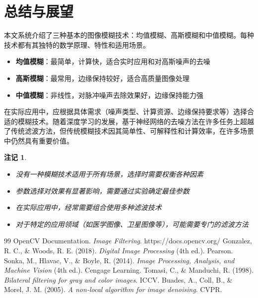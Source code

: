 \documentclass{article}
\newtheorem{remark}{注记}[section]
\begin{document}
\section{总结与展望}

本文系统介绍了三种基本的图像模糊技术：均值模糊、高斯模糊和中值模糊。每种技术都有其独特的数学原理、特性和适用场景。

\begin{itemize}
    \item \textbf{均值模糊}：最简单，计算快，适合实时应用和对高斯噪声的去噪
    \item \textbf{高斯模糊}：最常用，边缘保持较好，适合高质量图像处理
    \item \textbf{中值模糊}：非线性，对脉冲噪声去除效果好，边缘保持能力强
\end{itemize}

在实际应用中，应根据具体需求（噪声类型、计算资源、边缘保持要求等）选择合适的模糊技术。随着深度学习的发展，基于神经网络的去噪方法在许多任务上超越了传统滤波方法，但传统模糊技术因其简单性、可解释性和计算效率，在许多场景中仍然具有重要价值。

\begin{remark}
\begin{itemize}
    \item 没有一种模糊技术适用于所有场景，选择时需要权衡各种因素
    \item 参数选择对效果有显著影响，需要通过实验确定最佳参数
    \item 在实际应用中，经常需要组合使用多种滤波技术
    \item 对于特定的应用领域（如医学图像、卫星图像等），可能需要专门的滤波方法
\end{itemize}
\end{remark}

\begin{thebibliography}{99}
 OpenCV Documentation. \textit{Image Filtering}. https://docs.opencv.org/
 Gonzalez, R. C., \& Woods, R. E. (2018). \textit{Digital Image Processing} (4th ed.). Pearson.
 Sonka, M., Hlavac, V., \& Boyle, R. (2014). \textit{Image Processing, Analysis, and Machine Vision} (4th ed.). Cengage Learning.
 Tomasi, C., \& Manduchi, R. (1998). \textit{Bilateral filtering for gray and color images}. ICCV.
 Buades, A., Coll, B., \& Morel, J. M. (2005). \textit{A non-local algorithm for image denoising}. CVPR.
\end{thebibliography}
\end{document}
